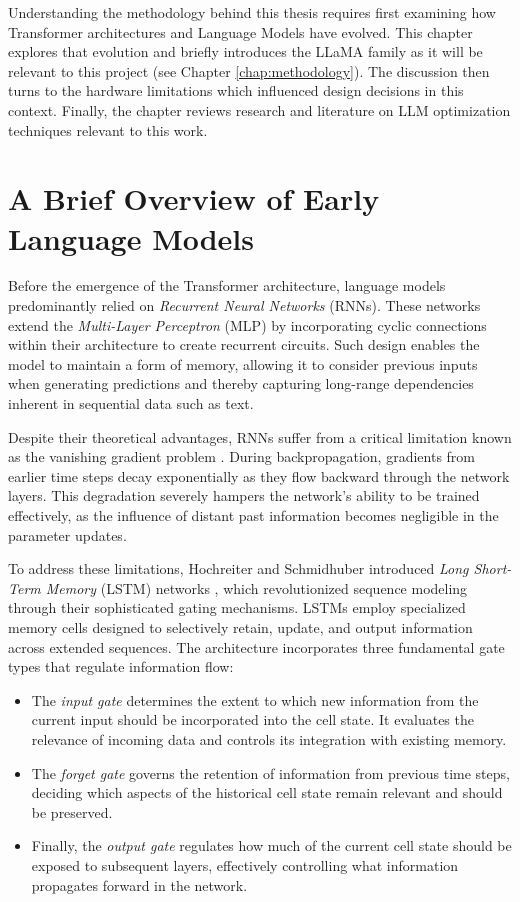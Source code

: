 Understanding the methodology behind this thesis requires first examining how Transformer architectures and Language Models have evolved. This chapter explores that evolution and briefly introduces the LLaMA family as it will be relevant to this project (see Chapter \ref{chap:methodology}). The discussion then turns to the hardware limitations which influenced design decisions in this context. Finally, the chapter reviews research and literature on LLM optimization techniques relevant to this work.

\section{A Brief Overview of Early Language Models}
Before the emergence of the Transformer architecture, language models predominantly relied on \textit{Recurrent Neural Networks} (RNNs). These networks extend the \textit{Multi-Layer Perceptron} (MLP) by incorporating cyclic connections within their architecture to create recurrent circuits. Such design enables the model to maintain a form of memory, allowing it to consider previous inputs when generating predictions and thereby capturing long-range dependencies inherent in sequential data such as text.

Despite their theoretical advantages, RNNs suffer from a critical limitation known as the vanishing gradient problem \cite{rnn}. During backpropagation, gradients from earlier time steps decay exponentially as they flow backward through the network layers. This degradation severely hampers the network's ability to be trained effectively, as the influence of distant past information becomes negligible in the parameter updates.

To address these limitations, Hochreiter and Schmidhuber introduced \textit{Long Short-Term Memory} (LSTM) networks \cite{lstm} \cite{hinton-lstm}, which revolutionized sequence modeling through their sophisticated gating mechanisms. LSTMs employ specialized memory cells designed to selectively retain, update, and output information across extended sequences.  The architecture incorporates three fundamental gate types that regulate information flow:
\begin{itemize}
    \item The \textit{input gate} determines the extent to which new information from the current input should be incorporated into the cell state. It evaluates the relevance of incoming data and controls its integration with existing memory.
    \item The \textit{forget gate} governs the retention of information from previous time steps, deciding which aspects of the historical cell state remain relevant and should be preserved.
    \item Finally, the \textit{output gate} regulates how much of the current cell state should be exposed to subsequent layers, effectively controlling what information propagates forward in the network.
\end{itemize}


